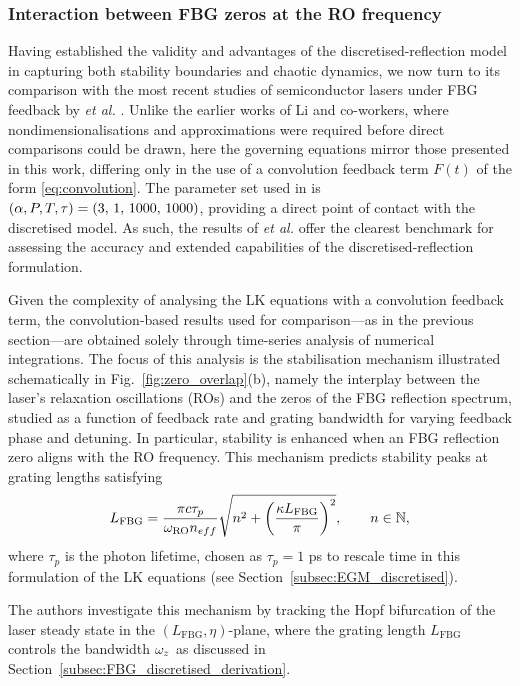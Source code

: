 \subsubsection{Interaction between FBG zeros at the RO frequency}
\label{subsubsec:skenderas}
%
Having established the validity and advantages of the discretised-reflection model in capturing both stability boundaries and chaotic dynamics, we now turn to its comparison with the most recent studies of semiconductor lasers under FBG feedback by \Skenderas \textit{et al.} \cite{skenderas2021feedback,skenderas2024impact}. 
Unlike the earlier works of Li and co-workers, where nondimensionalisations and approximations were required before direct comparisons could be drawn, here the governing equations mirror those presented in this work, differing only in the use of a convolution feedback term $F(t)$ of the form \eqref{eq:convolution}. 
The parameter set used in \cite{skenderas2021feedback,skenderas2024impact} is $(\alpha, P, T, \tau) = (3,\,1,\,1000,\,1000)$, providing a direct point of contact with the discretised model. 
As such, the results of \Skenderas \textit{et al.} offer the clearest benchmark for assessing the accuracy and extended capabilities of the discretised-reflection formulation.
%
\par
%
Given the complexity of analysing the LK equations with a convolution feedback term, the convolution-based results used for comparison—as in the previous section—are obtained solely through time-series analysis of numerical integrations. 
The focus of this analysis is the stabilisation mechanism illustrated schematically in Fig.~\ref{fig:zero_overlap}(b), namely the interplay between the laser’s relaxation oscillations (ROs) and the zeros of the FBG reflection spectrum, studied as a function of feedback rate and grating bandwidth for varying feedback phase and detuning. 
In particular, stability is enhanced when an FBG reflection zero aligns with the RO frequency. 
This mechanism predicts stability peaks at grating lengths satisfying \cite{skenderas2024impact}
%
\begin{equation}
    \label{eq:RO_stability}
    L_\text{FBG} = \frac{\pi c \tau_p}{\omega_\text{RO} n_{eff}} 
    \sqrt{n^2 + \left(\frac{\kappa L_\text{FBG}}{\pi}\right)^2}, 
    \qquad n \in \mathbb{N},
\end{equation}
%
where $\tau_p$ is the photon lifetime, chosen as $\tau_p = 1$ ps to rescale time in this formulation of the LK equations (see Section~\ref{subsec:EGM_discretised}).
%
\par
%
The authors investigate this mechanism by tracking the Hopf bifurcation of the laser steady state in the $(L_\text{FBG},\eta)$-plane, where the grating length $L_\text{FBG}$ controls the bandwidth $\omega_z$ as discussed in Section~\ref{subsec:FBG_discretised_derivation}. 
